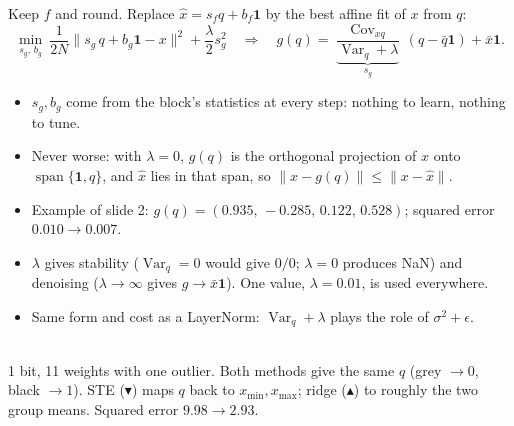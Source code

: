 \documentclass[11pt]{article}
\newcommand{\Var}{\operatorname{Var}}
\newcommand{\Cov}{\operatorname{Cov}}
\newcommand{\one}{\mathbf 1}
\begin{document}
\begin{minipage}[t]{0.56\textwidth}
Keep $f$ and round. Replace $\hat x=s_fq+b_f\one$ by the best affine fit of $x$ from $q$:
\[
\min_{s_g,\,b_g}\ \frac{1}{2N}\big\|s_g\,q+b_g\one-x\big\|^2+\frac{\lambda}{2}s_g^2
\quad\Longrightarrow\quad
g(q)=\underbrace{\frac{\Cov_{xq}}{\Var_q+\lambda}}_{s_g}\,(q-\bar q\one)+\bar x\one .
\]
\begin{itemize}
\item $s_g,b_g$ come from the block's statistics at every step: nothing to learn, nothing to tune.
\item Never worse: with $\lambda=0$, $g(q)$ is the orthogonal projection of $x$ onto $\operatorname{span}\{\one,q\}$, and $\hat x$ lies in that span, so $\|x-g(q)\|\le\|x-\hat x\|$.
\item Example of slide 2: $g(q)=(0.935,\,-0.285,\,0.122,\,0.528)$; squared error $0.010\to0.007$.
\item $\lambda$ gives stability ($\Var_q=0$ would give $0/0$; $\lambda=0$ produces NaN) and denoising ($\lambda\to\infty$ gives $g\to\bar x\one$). One value, $\lambda=0.01$, is used everywhere.
\item Same form and cost as a LayerNorm: $\Var_q+\lambda$ plays the role of $\sigma^2+\epsilon$.
\end{itemize}
\end{minipage}\hfill
\begin{minipage}[t]{0.40\textwidth}\vspace{0pt}\centering
{}\\[6pt]
\small 1 bit, 11 weights with one outlier. Both methods give the same $q$ (grey $\to0$, black $\to1$). STE ({\color{ste}$\blacktriangledown$}) maps $q$ back to $x_{\min},x_{\max}$; ridge ({\color{rdg}$\blacktriangle$}) to roughly the two group means. Squared error $9.98\to2.93$.
\end{minipage}
\end{document}
